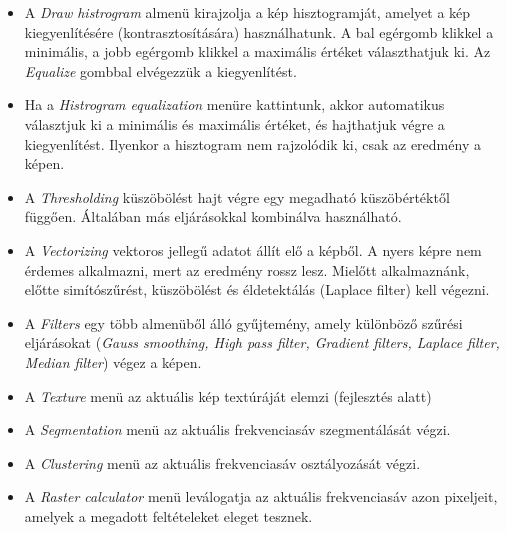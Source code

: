 \documentclass[a4paper,12pt]{article}
\begin{document}
\begin{itemize}
	
	\item A \textit{Draw histrogram} almenü kirajzolja a kép hisztogramját, amelyet a kép kiegyenlítésére (kontrasztosítására) használhatunk. A bal egérgomb klikkel a minimális, a jobb egérgomb klikkel a maximális értéket választhatjuk ki. Az \textit{Equalize} gombbal elvégezzük a kiegyenlítést. 
	\item Ha a \textit{Histrogram equalization} menüre kattintunk, akkor automatikus választjuk ki a minimális és maximális értéket, és hajthatjuk végre a kiegyenlítést. Ilyenkor a hisztogram nem rajzolódik ki, csak az eredmény a képen.
	
	\item A \textit{Thresholding} küszöbölést hajt végre egy megadható küszöbértéktől függően. Általában más eljárásokkal kombinálva használható.
	
	\item A \textit{Vectorizing} vektoros jellegű adatot állít elő a képből. A nyers képre nem érdemes alkalmazni, mert az eredmény rossz lesz. Mielőtt alkalmaznánk, előtte simítószűrést, küszöbölést és éldetektálás (Laplace filter) kell végezni. 
	
	\item A \textit{Filters} egy több almenüből álló gyűjtemény, amely különböző szűrési eljárásokat (\textit{Gauss smoothing, High pass filter, Gradient filters, Laplace filter, Median filter}) végez a képen. 
	
	\item A \textit{Texture} menü az aktuális kép textúráját elemzi (fejlesztés alatt)
	
	\item A \textit{Segmentation} menü az aktuális frekvenciasáv szegmentálását végzi.
	
	\item A \textit{Clustering} menü az aktuális frekvenciasáv  osztályozását végzi.
	
	\item A \textit{Raster calculator} menü leválogatja az aktuális frekvenciasáv azon pixeljeit, amelyek a megadott  feltételeket eleget tesznek.
	
	
\end{itemize}
\end{document}
